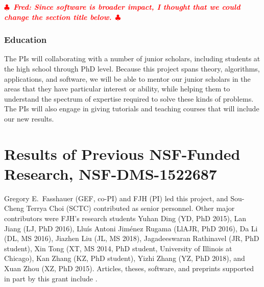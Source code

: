 \documentclass[11pt]{NSFamsart}
\newif\ifnotesw \noteswtrue
\newcommand{\notes}[1]{\ifnotesw \textcolor{red}{  $\clubsuit$\ {\sf \bf \it  #1}\ $\clubsuit$  }\fi}
\begin{document}
\fi

\notes{Fred:  Since software is broader impact, I thought that we could change the section title below.}

\subsubsection{Education}
The PIs will collaborating with a number of junior scholars, including students at the high school through PhD level.  Because this project spans theory, algorithms, applications, and software, we will be able to mentor our junior scholars in the areas that they have particular interest or ability, while helping them to understand the spectrum of expertise required to solve these kinds of problems.  The PIs will also engage in giving tutorials and teaching courses that will include our new results.


\section{Results of Previous NSF-Funded Research,
NSF-DMS-1522687} \label{sec:Previous}

Gregory E.\ Fasshauer (GEF, co-PI) and FJH (PI) led this project, and Sou-Cheng Terrya Choi (SCTC) contributed as senior personnel.  Other major contributors were FJH's research students Yuhan Ding (YD, PhD 2015), Lan Jiang (LJ, PhD 2016), 
Llu\'is Antoni Jim\'enez Rugama (LlAJR, PhD 2016), Da Li (DL, MS 2016), Jiazhen Liu (JL, MS 2018), Jagadeeswaran Rathinavel (JR, 
PhD student), Xin Tong (XT, MS 2014, PhD student, University of Illinois at Chicago), Kan Zhang (KZ, PhD student), Yizhi Zhang (YZ, PhD 2018), and Xuan Zhou (XZ, PhD 2015).  Articles, theses,  
software, and preprints supported in 
part by this 
grant 
include 
\cite{ala_augmented_2017, 
	ChoEtal17a,
	ChoEtal17b,
	Din15a, 
	DinHic20a,
	GilEtal16a,
	Hic17a,
	HicJag18b,
	HicJim16a,
	HicEtal18a,
	HicEtal17a,
	HicKriWoz19a,
	RatHic19a,
	GilJim16b,
	JimHic16a,
	JohFasHic18a,
	Li16a,
	Liu17a,
	MarEtal18a,
	mccourt_stable_2017,
	MCCEtal19a,
	mishra_hybrid_2018,
	MisEtal19a,
	rashidinia_stable_2016,
	rashidinia_stable_2018,
	Zha18a,
	Zha17a,
	Zho15a,
	ZhoHic15a}.
\end{document}
